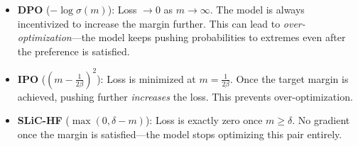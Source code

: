\begin{remark}
    \begin{itemize}
        \item \textbf{DPO} ($-\log \sigma(m)$): Loss $\to 0$ as $m \to \infty$. The model is always incentivized to increase the margin further. This can lead to \emph{over-optimization}---the model keeps pushing probabilities to extremes even after the preference is satisfied.

        \item \textbf{IPO} ($(m - \frac{1}{2\beta})^2$): Loss is minimized at $m = \frac{1}{2\beta}$. Once the target margin is achieved, pushing further \emph{increases} the loss. This prevents over-optimization.

        \item \textbf{SLiC-HF} ($\max(0, \delta - m)$): Loss is exactly zero once $m \geq \delta$. No gradient once the margin is satisfied---the model stops optimizing this pair entirely.
    \end{itemize}
\end{remark}


